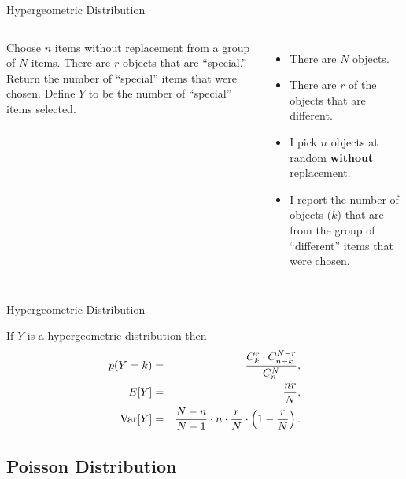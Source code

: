 \begin{frame}{Hypergeometric Distribution}

  \begin{columns}
    \begin{definition}
      Choose $n$ items without replacement from a group of $N$
      items. There are $r$ objects that are ``special.'' Return the
      number of ``special'' items that were chosen. Define $Y$ to be
      the number of ``special'' items selected.
    \end{definition}
    \begin{itemize}
    \item There are $N$ objects.
    \item There are $r$ of the objects that are different.
    \item I pick $n$ objects at random \textbf{without} replacement.
    \item I report the number of objects ($k$) that are from the group
      of ``different'' items that were chosen.
    \end{itemize}
  \end{columns}
  \vfill


\end{frame}

\begin{frame}{Hypergeometric Distribution}


    If $Y$ is a hypergeometric distribution then
    \begin{eqnarray*}
      p(Y=k) & = & \frac{C^r_k \cdot C^{N-r}_{n-k}}{C^N_n}, \\
      E[Y] & = & \frac{nr}{N}, \\
      \mathrm{Var}[Y] & = & \frac{N-n}{N-1} \cdot n \cdot \frac{r}{N} \cdot \left( 1-\frac{r}{N}\right).
    \end{eqnarray*}

\end{frame}


\subsection{Poisson Distribution}

